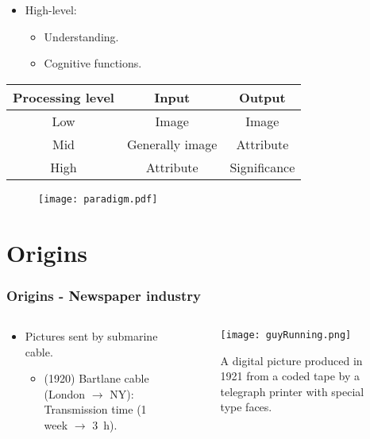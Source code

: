 \begin{frame}
\begin{itemize}
\item High-level:
\begin{itemize}
\item Understanding.
\item Cognitive functions.
\end{itemize}
\end{itemize}
\begin{table}
\centering
\begin{tabular}{|c|c|c|}
\hline 
Processing level & Input & Output \\ 
\hline 
\hline
Low & Image & Image \\ 
\hline 
Mid & Generally image & Attribute \\ 
\hline 
High & Attribute & Significance \\ 
\hline 
\end{tabular} 
\end{table}
\begin{figure}
\texttt{[image: paradigm.pdf]}
\end{figure}
\end{frame}

\section{Origins}


\begin{frame}
\frametitle{Origins - Newspaper industry}
\begin{columns}
\begin{column}{.5\textwidth}
\begin{itemize}
\item Pictures sent by submarine cable.%
\begin{itemize}
\item (1920) Bartlane cable (London $\rightarrow$ NY): Transmission time (1 week $\rightarrow$ 3~h).
\end{itemize}
\end{itemize}
\end{column}
\begin{column}{.5\textwidth}
\begin{figure}
\texttt{[image: guyRunning.png]}
\caption{A digital picture produced in 1921 from a coded tape by a telegraph printer with special type faces.}
\end{figure}
\end{column}
\end{columns}
\end{frame}

